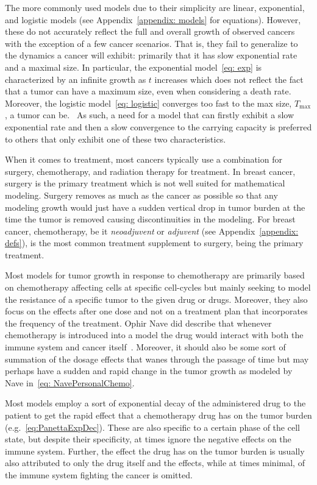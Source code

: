 \documentclass[11pt]{amsart}
\begin{document}
The more commonly used models due to their simplicity are linear, exponential, and logistic models (see Appendix\ \ref{appendix: models} for equations).
However, these do not accurately reflect the full and overall growth of observed cancers with the exception of a few cancer scenarios.
That is, they fail to generalize to the dynamics a cancer will exhibit: primarily that it has slow exponential rate and a maximal size.
In particular, the exponential model\ \eqref{eq: exp} is characterized by an infinite growth as $t$ increases which does not reflect the fact that a tumor can have a maximum size, even when considering a death rate.
Moreover, the logistic model\ \eqref{eq: logistic} converges too fast to the max size, $T_{\max}$, a tumor can be.\ \cite{Steb23}
As such, a need for a model that can firstly exhibit a slow exponential rate and then a slow convergence to the carrying capacity is preferred to others that only exhibit one of these two characteristics.

When it comes to treatment, most cancers typically use a combination for surgery, chemotherapy, and radiation therapy for treatment.
In breast cancer, surgery is the primary treatment which is not well suited for %
mathematical modeling. 
Surgery removes as much as the cancer as possible so that any modeling growth would just have a sudden vertical drop in tumor burden at the time the tumor is removed causing discontinuities in the modeling.
For breast cancer, chemotherapy, be it \textit{neoadjuvent} or \textit{adjuvent} (see Appendix\ \ref{appendix: defs}), is the most common treatment supplement to surgery, being the primary treatment.

Most models for tumor growth in response to chemotherapy are primarily based on chemotherapy affecting cells at specific cell-cycles but mainly seeking to model the resistance of a specific tumor to the given drug or drugs.
Moreover, they also focus on the effects after one dose and not on a treatment plan that incorporates the frequency of the treatment.
Ophir Nave did describe that whenever chemotherapy is introduced into a model the drug would interact with both the immune system and cancer itself\ \cite{NAVE2022e09288}.
Moreover, it should also be some sort of summation of the dosage effects that wanes through the passage of time but may perhaps have a sudden and rapid change in the tumor growth as modeled by Nave in\ \eqref{eq: NavePersonalChemo}.

Most models employ a sort of %
exponential decay of the administered drug to the patient to get the rapid effect that a chemotherapy drug has on the tumor burden (e.g.\ \eqref{eq:PanettaExpDec}).
These are also specific to a certain phase of the cell state, but despite their specificity, at times ignore the negative effects on the immune system.
Further, the effect the drug has on the tumor burden is usually also attributed to only the drug itself and the effects, while at times minimal, of the immune system fighting the cancer is omitted.
\end{document}
